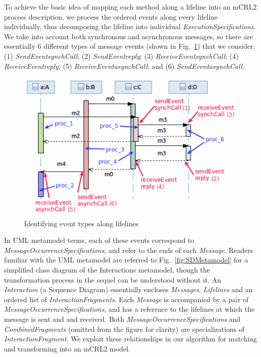 \documentclass[letter]{llncs}
\begin{document}
To achieve the basic idea of mapping each method along a lifeline into an mCRL2 process description, we process the ordered events along every
lifeline individually, thus decomposing the lifeline into individual \emph{ExecutionSpecifications}. 
We take into account both synchronous and asynchronous messages, 
so there are essentially 6 different types of message events (shown in Fig.~\ref{fig:exampleProcesses}) that we consider: 
(1) \emph{SendEvent}\textunderscore\emph{synchCall}; (2) \emph{SendEvent}\textunderscore\emph{reply}; (3) \emph{ReceiveEvent}\textunderscore\emph{synchCall}; 
(4) \emph{ReceiveEvent}\textunderscore\emph{reply};
(5) \emph{ReceiveEvent}\textunderscore\emph{asynchCall}; and (6) \emph{SendEvent}\textunderscore\emph{asynchCall}.
\begin{figure}[!t]
\centering

\includegraphics[width=0.65\linewidth,keepaspectratio=true]{./Figure6.png}
\caption{Identifying event types along lifelines}
\label{fig:exampleProcesses}
\vspace{.5cm}
\end{figure}
In UML metamodel terms, each of these events correspond to \emph{MessageOccurrenceSpecifications}, and refer to the ends of each \emph{Message}.
Readers familiar with the UML metamodel are referred to Fig.~\ref{fig:SDMetamodel}
for a simplified class diagram of the Interactions metamodel,
though the transformation process in the sequel can be understood
without it.
An \emph{Interaction} (a Sequence Diagram)
essentially encloses \emph{Messages}, \emph{Lifelines} and an ordered list of \emph{InteractionFragments}.
Each \emph{Message} is accompanied by a pair of \emph{MessageOccurrenceSpecifications}, and has a reference to
the lifelines at which the message is sent and and received. 
Both \emph{MessageOccurrenceSpecifications} and \emph{CombinedFragments} (omitted from the figure for clarity) 
are specializations of \emph{InteractionFragment}.
We exploit these relationships in our algorithm for matching and transforming into an mCRL2 model.
\end{document}
